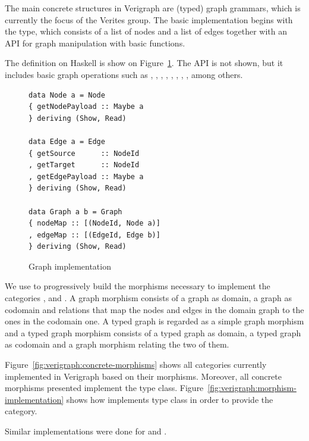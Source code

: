 The main concrete structures in Verigraph are (typed) graph grammars, which is currently the focus of the Verites group. The basic implementation begins with the  type, which consists of a list of nodes and a list of edges together with an API for graph manipulation with basic functions.

The  definition on Haskell is show on Figure~\ref{fig:verigraph:graph}. The API is not shown, but it includes basic graph operations such as , , , , , , , , among others. 

\begin{figure}[!ht]

\caption{Graph implementation}
\begin{verbatim}
data Node a = Node 
{ getNodePayload :: Maybe a
} deriving (Show, Read)

data Edge a = Edge 
{ getSource      :: NodeId
, getTarget      :: NodeId
, getEdgePayload :: Maybe a
} deriving (Show, Read)

data Graph a b = Graph 
{ nodeMap :: [(NodeId, Node a)]
, edgeMap :: [(EdgeId, Edge b)]
} deriving (Show, Read)
\end{verbatim}
\label{fig:verigraph:graph}
\end{figure}

We use  to progressively build the morphisms necessary to implement the categories ,  and . A graph morphism consists of a graph as domain, a graph as codomain and relations that map the nodes and edges in the domain graph to the ones in the codomain one. A typed graph is regarded as a simple graph morphism and a typed graph morphism consists of a typed graph as domain, a typed graph as codomain and a graph morphism relating the two of them.

Figure~\ref{fig:verigraph:concrete-morphisms} shows all categories currently implemented in Verigraph based on their morphisms. Moreover, all concrete morphisms presented implement the  type class. Figure~\ref{fig:verigraph:morphism-implementation} shows how  implements  type class in order to provide the  category.

Similar implementations were done for  and .

